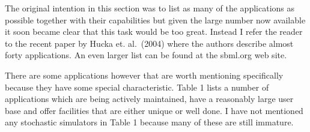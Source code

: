 \documentclass[12pt]{article}
\begin{document}
{The original intention in this section was to list as many of the applications as
possible together with their capabilities but given the large
number now available it soon became clear that this task would be
too great. Instead I refer the reader to the recent paper by Hucka
et. al.\ (2004) where the authors describe almost forty
applications. An even larger list can be found at the sbml.org web
site.

There are some applications however that are worth mentioning specifically because they have some special characteristic. Table 1 lists a number of applications which are being actively maintained, have a reasonably large user base and offer facilities that are either unique or well done. I have not mentioned any stochastic simulators in Table 1 because
many of these are still immature.

}
\end{document}
